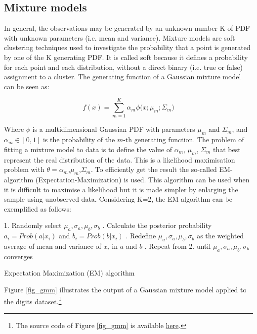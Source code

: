 \subsection{Mixture models} \label{secGaussianMixture}
In general, the observations may be generated by an unknown number K of PDF with unknown parameters (i.e. mean and variance). Mixture models are soft clustering techniques used to investigate the probability that a point is generated by one of the K generating PDF. It is called soft because it defines a probability for each point and each distribution, without a direct binary (i.e. true or false) assignment to a cluster. The generating function of a Gaussian mixture model can be seen as:

\begin{equation}
f\left(x\right)=\sum_{m=1}^{K}{\alpha_m\phi(x;\mu_m;\Sigma_m})
\label{eq_gmm}
\end{equation}

Where $\phi$ is a multidimensional Gaussian PDF with parameters $\mu_m$ and $\Sigma_m$, and $\alpha_m\in[0,1]$ is the probability of the $m$-th generating function. The problem of fitting a mixture model to data is to define the value of $\alpha_m$, $\mu_m$, $\Sigma_m$ that best represent the real distribution of the data. This is a likelihood maximisation problem with $\theta=\alpha_m$,$\mu_m$,$\Sigma_m$. To efficiently get the result the so-called EM-algorithm (Expectation-Maximization) is used. This algorithm can be used when it is difficult to maximise a likelihood but it is made simpler by enlarging the sample using unobserved data. Considering K=2, the EM algorithm can be exemplified as follows:

\begin{algorithm}[H]
\DontPrintSemicolon
\SetAlgoLined
    
    1. Randomly select $\mu_a,\sigma_a,\mu_b,\sigma_b$ . Calculate the posterior probability $a_i=Prob(a|x_i)$ and $b_i=Prob(b|x_i)$ . Redefine $\mu_a,\sigma_a,\mu_b,\sigma_b$ as the weighted average of mean and variance of $x_i$ in $a$ and $b$ . Repeat from 2. until $\mu_a,\sigma_a,\mu_b,\sigma_b$ converges\;
    
    
    
   
\caption{Expectation Maximization (EM) algorithm}
\label{algo_EM}        
\end{algorithm}

Figure \ref{fig_gmm} illustrates the output of a Gaussian mixture model applied to the digits dataset.\footnote{The source code of Figure \ref{fig_gmm} is available \href{https://github.com/aletuf93/logproj/blob/master/examples/06.\%20Unsupervised\%20learning.ipynb}{here}.}

